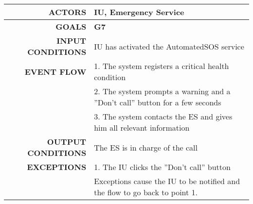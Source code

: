 \begin{table}[h!]
\begin{tabular}{|r|p{3in}|}
\hline
\textbf{ACTORS} & IU, Emergency Service\\
\hline
\textbf{GOALS} & \textbf{G7} \\
\hline
\textbf{INPUT CONDITIONS} & IU has activated the AutomatedSOS service \\
\hline
\textbf{EVENT FLOW} 
&1. The system registers a critical health condition \\
&2. The system prompts a warning and a ''Don't call'' button for a few seconds \\
&3. The system contacts the ES and gives him all relevant information \\
\hline
\textbf{OUTPUT CONDITIONS} & The ES is in charge of the call\\
\hline
\textbf{EXCEPTIONS} 
&1. The IU clicks the ''Don't call'' button \\
&Exceptions cause the IU to be notified and the flow to go back to point 1.\\
\hline
\end{tabular}
\end{table}